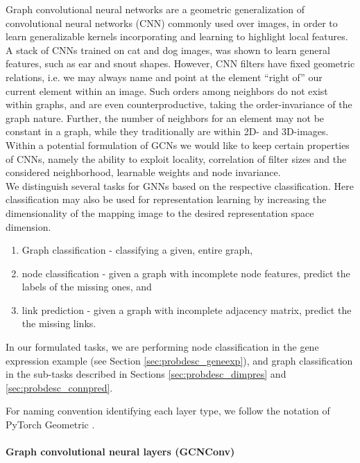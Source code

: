 \documentclass[]{article}
\renewcommand{\cite}{\citep}
\begin{document}
Graph convolutional neural networks are a geometric generalization of convolutional neural networks (CNN) commonly used over images, in order to learn generalizable kernels incorporating and learning to highlight local features. A stack of CNNs trained on cat and dog images, was shown to learn general features, such as ear and snout shapes. 
However, CNN filters have fixed geometric relations, i.e. we may always name and point at the element ``right of'' our current element within an image. Such orders among neighbors do not exist within graphs, and are even counterproductive, taking the order-invariance of the graph nature. Further, the number of neighbors for an element may not be constant in a graph, while they traditionally are within 2D- and 3D-images. Within a potential formulation of GCNs we would like to keep certain properties of CNNs, namely the ability to exploit locality, correlation of filter sizes and the considered neighborhood, learnable weights and node invariance. \\

We distinguish several tasks for GNNs based on the respective classification. Here classification may also be used for representation learning by increasing the dimensionality of the mapping image to the desired representation space dimension. 
\begin{enumerate}
	\item Graph classification - classifying a given, entire graph,
	\item node classification -  given a graph with incomplete node features, predict the labels of the missing ones, and
	\item link prediction - given a graph with incomplete adjacency matrix, predict the the missing links.
\end{enumerate}
In our formulated tasks, we are performing node classification in the gene expression example (see Section \ref{sec:probdesc_geneexp}), and graph classification in the sub-tasks described in Sections \ref{sec:probdesc_dimpres} and \ref{sec:probdesc_connpred}.

For naming convention identifying each layer type, we follow the notation of PyTorch Geometric \cite{PytorchGeometric}.

\paragraph{Graph convolutional neural layers (GCNConv)}\mbox{}\\
\label{sec:GCNConv}
\end{document}
